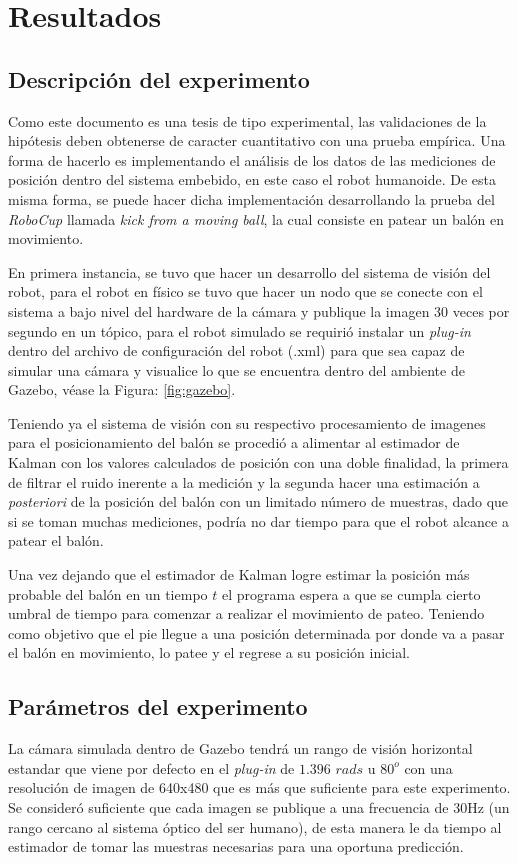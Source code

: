 \chapter{Resultados}
\section{Descripción del experimento}
	Como este documento es una tesis de tipo experimental, las validaciones de la hipótesis deben obtenerse de caracter cuantitativo con una prueba empírica. Una forma de hacerlo es implementando el análisis de los datos de las mediciones de posición dentro del sistema embebido, en este caso el robot humanoide. De esta misma forma, se puede hacer dicha implementación desarrollando la prueba del \textit{RoboCup} llamada \textit{kick from a moving ball}, la cual consiste en patear un balón en movimiento.

	En primera instancia, se tuvo que hacer un desarrollo del sistema de visión del robot, para el robot en físico se tuvo que hacer un nodo que se conecte con el sistema a bajo nivel del hardware de la cámara y publique la imagen 30 veces por segundo en un tópico, para el robot simulado se requirió instalar un \textit{plug-in} dentro del archivo de configuración del robot (.xml) para que sea capaz de simular una cámara y visualice lo que se encuentra dentro del ambiente de Gazebo, véase la Figura: \ref{fig:gazebo}.

	Teniendo ya el sistema de visión con su respectivo procesamiento de imagenes para el posicionamiento del balón se procedió a alimentar al estimador de Kalman con los valores calculados de posición con una doble finalidad, la primera de filtrar el ruido inerente a la medición y la segunda hacer una estimación a \textit{posteriori} de la posición del balón con un limitado número de muestras, dado que si se toman muchas mediciones, podría no dar tiempo para que el robot alcance a patear el balón.
	
	Una vez dejando que el estimador de Kalman logre estimar la posición más probable del balón en un tiempo $t$ el programa espera a que se cumpla cierto umbral de tiempo para comenzar a realizar el movimiento de pateo. Teniendo como objetivo que el pie llegue a una posición determinada por donde va a pasar el balón en movimiento, lo patee y el regrese a su posición inicial.	
\section{Parámetros del experimento}
	La cámara simulada dentro de Gazebo tendrá un rango de visión horizontal estandar que viene por defecto en el \textit{plug-in} de $1.396$ $ rads$ u $80^o$ con una resolución de imagen de 640x480 que es más que suficiente para este experimento. Se consideró suficiente que cada imagen se publique a una frecuencia de 30Hz (un rango cercano al sistema óptico del ser humano), de esta manera le da tiempo al estimador de tomar las muestras necesarias para una oportuna predicción.

